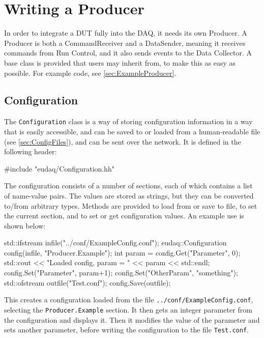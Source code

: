 \section{Writing a Producer}\label{sec:Producers}
In order to integrate a \gls{DUT} fully into the DAQ, it needs its own Producer.
A Producer is both a CommandReceiver and a DataSender,
meaning it receives commands from Run Control,
and it also sends events to the Data Collector.
A base class is provided that users may inherit from, to make this as easy as possible.
For example code, see \autoref{sec:ExampleProducer}.

\subsection{Configuration}
The \texttt{Configuration} class is a way of storing configuration information
in a way that is easily accessible, and can be saved to or loaded from a human-readable file
(see \autoref{sec:ConfigFiles}), and can be sent over the network.
It is defined in the following header:

\begin{listing}
#include "eudaq/Configuration.hh"
\end{listing}

The configuration consists of a number of sections,
each of which contains a list of name-value pairs.
The values are stored as strings, but they can be converted to/from arbitrary types.
Methods are provided to load from or save to file, to set the current section,
and to set or get configuration values.
An example use is shown below:

\begin{listing}
std::ifstream infile("../conf/ExampleConfig.conf");
eudaq::Configuration config(infile, "Producer.Example");
int param = config.Get("Parameter", 0);
std::cout << "Loaded config, param = " << param << std::endl;
config.Set("Parameter", param+1);
config.Set("OtherParam", "something");
std::ofstream outfile("Test.conf");
config.Save(outfile);
\end{listing}

This creates a configuration loaded from the file \texttt{../conf/ExampleConfig.conf},
selecting the \texttt{Producer.Example} section.
It then gets an integer parameter from the configuration and displays it.
Then it modifies the value of the parameter and sets another parameter,
before writing the configuration to the file \texttt{Test.conf}.

